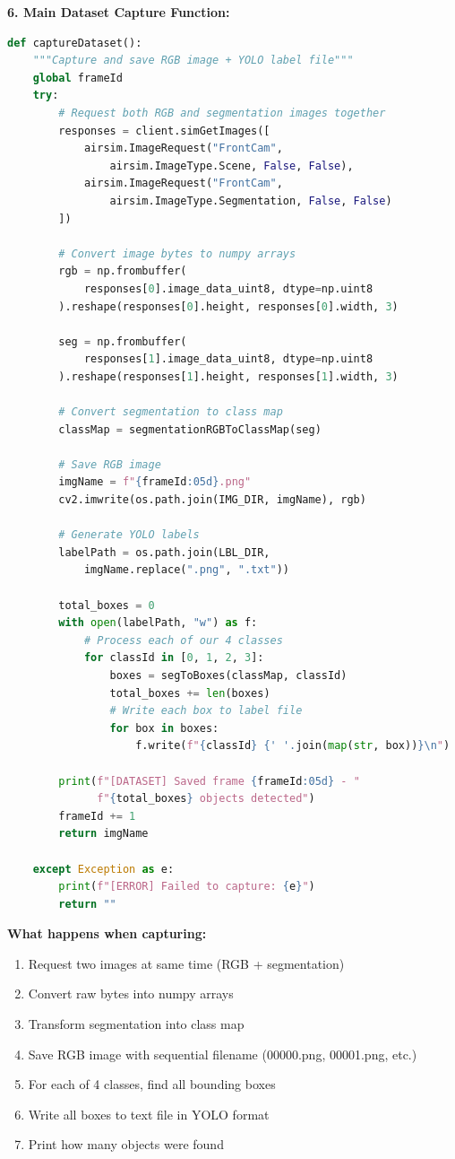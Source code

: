 \textbf{6. Main Dataset Capture Function:}
\begin{lstlisting}[language=Python]
def captureDataset():
    """Capture and save RGB image + YOLO label file"""
    global frameId
    try:
        # Request both RGB and segmentation images together
        responses = client.simGetImages([
            airsim.ImageRequest("FrontCam", 
                airsim.ImageType.Scene, False, False),
            airsim.ImageRequest("FrontCam", 
                airsim.ImageType.Segmentation, False, False) 
        ])
        
        # Convert image bytes to numpy arrays
        rgb = np.frombuffer(
            responses[0].image_data_uint8, dtype=np.uint8
        ).reshape(responses[0].height, responses[0].width, 3)
        
        seg = np.frombuffer(
            responses[1].image_data_uint8, dtype=np.uint8
        ).reshape(responses[1].height, responses[1].width, 3)
        
        # Convert segmentation to class map
        classMap = segmentationRGBToClassMap(seg)
        
        # Save RGB image
        imgName = f"{frameId:05d}.png"
        cv2.imwrite(os.path.join(IMG_DIR, imgName), rgb)
        
        # Generate YOLO labels
        labelPath = os.path.join(LBL_DIR, 
            imgName.replace(".png", ".txt"))
        
        total_boxes = 0
        with open(labelPath, "w") as f:
            # Process each of our 4 classes
            for classId in [0, 1, 2, 3]:
                boxes = segToBoxes(classMap, classId)
                total_boxes += len(boxes)
                # Write each box to label file
                for box in boxes:
                    f.write(f"{classId} {' '.join(map(str, box))}\n")
        
        print(f"[DATASET] Saved frame {frameId:05d} - "
              f"{total_boxes} objects detected")
        frameId += 1
        return imgName
        
    except Exception as e:
        print(f"[ERROR] Failed to capture: {e}")
        return ""
\end{lstlisting}

\textbf{What happens when capturing:}
\begin{enumerate}
	\item Request two images at same time (RGB + segmentation)
	\item Convert raw bytes into numpy arrays
	\item Transform segmentation into class map
	\item Save RGB image with sequential filename (00000.png, 00001.png, etc.)
	\item For each of 4 classes, find all bounding boxes
	\item Write all boxes to text file in YOLO format
	\item Print how many objects were found
\end{enumerate}

